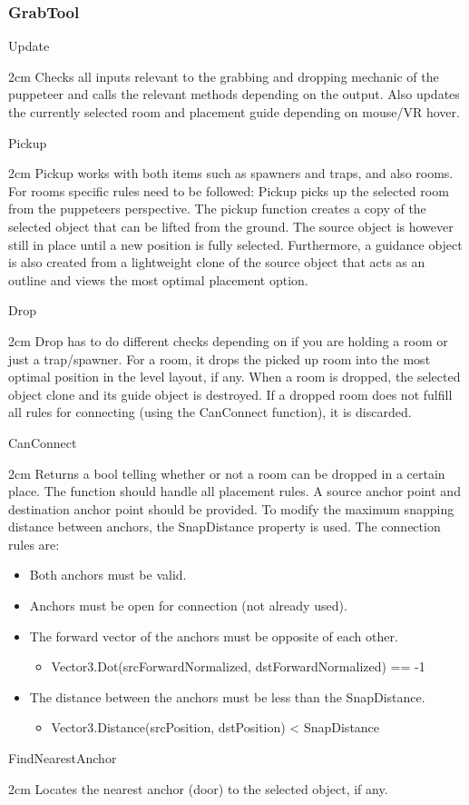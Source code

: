 \documentclass[11pt]{article}
\newenvironment{indentall}{\begin{adjustwidth}{2cm}{}}{\end{adjustwidth}}
\begin{document}
\subsubsection{GrabTool}
Update
\begin{indentall}
Checks all inputs relevant to the grabbing and dropping mechanic of the puppeteer and calls the relevant methods depending on the output. Also updates the currently selected room and placement guide depending on mouse/VR hover.
\end{indentall}
Pickup
\begin{indentall}
Pickup works with both items such as spawners and traps, and also rooms. For rooms specific rules need to be followed: Pickup picks up the selected room from the puppeteers perspective. The pickup function creates a copy of the selected object that can be lifted from the ground. The source object is however still in place until a new position is fully selected. Furthermore, a guidance object is also created from a lightweight clone of the source object that acts as an outline and views the most optimal placement option.
\end{indentall}
Drop
\begin{indentall}
Drop has to do different checks depending on if you are holding a room or just a trap/spawner. For a room, it drops the picked up room into the most optimal position in the level layout, if any. When a room is dropped, the selected object clone and its guide object is destroyed. If a dropped room does not fulfill all rules for connecting (using the CanConnect function), it is discarded.
\end{indentall}
CanConnect
\begin{indentall}
Returns a bool telling whether or not a room can be dropped in a certain place. The function should handle all placement rules. A source anchor point and destination anchor point should be provided. To modify the maximum snapping distance between anchors, the SnapDistance property is used. The connection rules are:
\begin{itemize}
	\item Both anchors must be valid.
	\item Anchors must be open for connection (not already used).
	\item The forward vector of the anchors must be opposite of each other.
	\begin{itemize}
		\item Vector3.Dot(srcForwardNormalized, dstForwardNormalized) == -1
	\end{itemize}
	\item The distance between the anchors must be less than the SnapDistance.
	\begin{itemize}
		\item Vector3.Distance(srcPosition, dstPosition) < SnapDistance
	\end{itemize}
\end{itemize}
\end{indentall}
FindNearestAnchor
\begin{indentall}
Locates the nearest anchor (door) to the selected object, if any.
\end{indentall}
\end{document}
